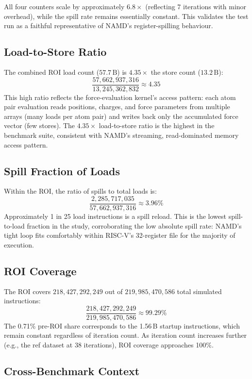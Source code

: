 \documentclass[conference]{IEEEtran}
\begin{document}
All four counters scale by approximately $6.8\times$ (reflecting
7 iterations with minor overhead), while the spill rate remains
essentially constant. This validates the test run as a faithful
representative of NAMD's register-spilling behaviour.

\subsection{Load-to-Store Ratio}

The combined ROI load count ($57.7\,\text{B}$) is $4.35\times$
the store count ($13.2\,\text{B}$):
\[
\frac{57{,}662{,}937{,}316}{13{,}245{,}362{,}832} \approx 4.35
\]
This high ratio reflects the force-evaluation kernel's access pattern:
each atom pair evaluation reads positions, charges, and force
parameters from multiple arrays (many loads per atom pair) and writes
back only the accumulated force vector (few stores). The $4.35\times$
load-to-store ratio is the highest in the benchmark suite, consistent
with NAMD's streaming, read-dominated memory access pattern.

\subsection{Spill Fraction of Loads}

Within the ROI, the ratio of spills to total loads is:
\[
\frac{2{,}285{,}717{,}035}{57{,}662{,}937{,}316} \approx 3.96\%
\]
Approximately 1 in 25 load instructions is a spill reload. This is
the lowest spill-to-load fraction in the study, corroborating the
low absolute spill rate: NAMD's tight loop fits comfortably within
RISC-V's 32-register file for the majority of execution.

\subsection{ROI Coverage}

The ROI covers $218{,}427{,}292{,}249$ out of
$219{,}985{,}470{,}586$ total simulated instructions:
\[
\frac{218{,}427{,}292{,}249}{219{,}985{,}470{,}586} \approx 99.29\%
\]
The 0.71\% pre-ROI share corresponds to the 1.56\,B startup
instructions, which remain constant regardless of iteration count.
As iteration count increases further (e.g., the ref dataset at 38
iterations), ROI coverage approaches 100\%.

\subsection{Cross-Benchmark Context}
\end{document}

